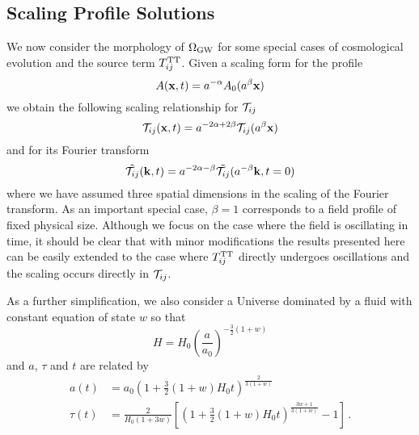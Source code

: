\documentclass{revtex4}
\begin{document}
\subsection{Scaling Profile Solutions}
We now consider the morphology of $\Omega_{\rm GW}$ for some special cases of cosmological evolution and the source term $T_{ij}^{{\rm TT}}$.
Given a scaling form for the profile
\begin{equation}
  A({\bf x},t) = a^{-\alpha} A_0(a^\beta{\bf x})
\end{equation}
we obtain the following scaling relationship for $\mathcal{T}_{ij}$
\begin{equation}
  \mathcal{T}_{ij}({\bf x},t) = a^{-2\alpha+2\beta}\mathcal{T}_{ij}(a^\beta{\bf x})
\end{equation}
and for its Fourier transform
\begin{equation}
  \tilde{\mathcal{T}_{ij}}({\bf k},t) = a^{-2\alpha-\beta}\tilde{\mathcal{T}_{ij}}(a^{-\beta}{\bf k},t=0)
\end{equation}
where we have assumed three spatial dimensions in the scaling of the Fourier transform.
As an important special case, $\beta=1$ corresponds to a field profile of fixed physical size.
Although we focus on the case where the field is oscillating in time, it should be clear that with minor modifications the results presented here can be easily extended to the case where $T_{ij}^{{\rm TT}}$ directly undergoes oscillations and the scaling occurs directly in $\mathcal{T}_{ij}$.

As a further simplification, we also consider a Universe dominated by a fluid with constant equation of state $w$ so that
\begin{equation}
  H = H_0 \left(\frac{a}{a_0}\right)^{-\frac{3}{2}(1+w)}
\end{equation}
and $a$, $\tau$ and $t$ are related by
\begin{subequations}
\begin{align}
  a(t)    &= a_0\left(1 + \frac{3}{2}(1+w)H_0t \right)^{\frac{2}{3(1+w)}}\\
  \tau(t) &= \frac{2}{H_0(1+3w)}\left[\left(1+\frac{3}{2}(1+w)H_0t\right)^{\frac{3w+1}{3(1+w)}} - 1 \right] \, .
\end{align}
\end{subequations}
\end{document}
